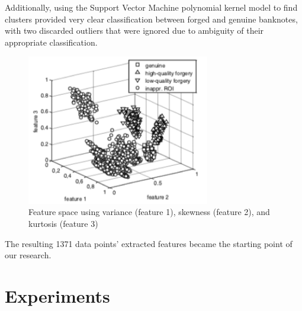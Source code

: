 \documentclass{article}
\begin{document}
\newline\newline
Additionally, using the Support Vector Machine polynomial kernel model to find clusters provided very clear classification between forged and genuine banknotes, with two discarded outliers that were ignored due to ambiguity of their appropriate classification.
\begin{figure}
  \centering
\includegraphics[width=80mm]{feature_space.png}
  \caption{Feature space using variance (feature 1), skewness (feature 2), and kurtosis (feature 3)}
\end{figure}
\newline\newline
The resulting 1371 data points' extracted features became the starting point of our research. 

\section{Experiments}
\end{document}
